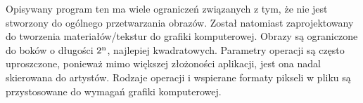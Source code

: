 Opisywany program ten ma wiele ograniczeń związanych z tym, że nie jest stworzony do ogólnego przetwarzania obrazów. Został natomiast zaprojektowany do tworzenia materiałów/tekstur do grafiki komputerowej. 
Obrazy są ograniczone do boków o długości $2\textsuperscript{n}$, najlepiej kwadratowych. 
Parametry operacji są często uproszczone, ponieważ mimo większej złożoności aplikacji, jest ona nadal skierowana do artystów. 
Rodzaje operacji i wspierane formaty pikseli w pliku są przystosowane do wymagań grafiki komputerowej.
